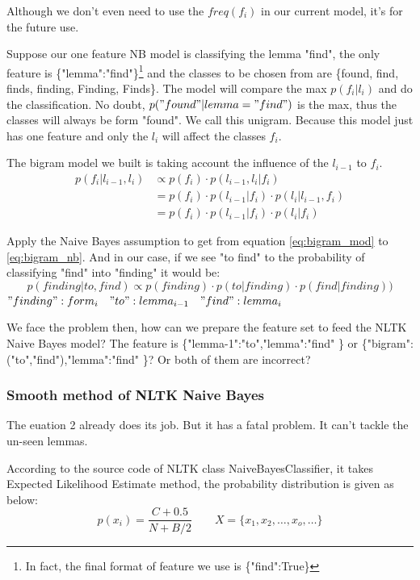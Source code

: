 \documentclass[a4paper]{article}
\begin{document}
{Although we don't even need to use the $freq(f_i)$ in our current model, it's for the future use.

Suppose our one feature NB model is classifying the lemma "find", the only feature is \{"lemma":"find"\}\footnote{In fact, the final format of feature we use is \{"find":True\}} and the classes to be chosen from are \{found, find, finds, finding, Finding, Finds\}. The model will compare the max $p(f_i|l_i)$ and do the classification. No doubt, $p("found" | lemma="find")$ is the max, thus the classes will always be form "found". We call this unigram. Because this model just has one feature and only the $l_i$ will affect the classes $f_i$. 

The bigram model we built is taking account the influence of the $l_{i-1}$ to $f_i$.
\begin{align}
p(f_i|l_{i-1},l_i) &\propto p(f_i) \cdot  p(l_{i-1},l_i|f_i)  \\
&= p(f_i) \cdot  p(l_{i-1}|f_i) \cdot p( l_i | l_{i-1},f_i) \label{eq:bigram_mod} \\
&= p(f_i) \cdot  p(l_{i-1}|f_i) \cdot p( l_i | f_i) \label{eq:bigram_nb}
\end{align}

Apply the Naive Bayes assumption to get from equation \ref{eq:bigram_mod} to \ref{eq:bigram_nb}. And in our case, if we see "to find" to the probability of classifying "find" into "finding"   it would be:
\begin{equation}
p(finding | to,find) \propto p(finding)\cdot p(to | finding) \cdot  p(find | finding))
\end{equation}
$"finding":form_i \quad "to":lemma_{i-1} \quad "find":lemma_i$


We face the problem then, how can we prepare the feature set to feed the NLTK Naive Bayes model? The feature is \{"lemma-1":"to","lemma":"find" \} or 
 \{"bigram":("to","find"),"lemma":"find" \}? Or both of them are incorrect? 
\subsubsection{Smooth method of NLTK Naive Bayes}
The euation 2 already does its job. But it has a fatal problem. It can't tackle the un-seen lemmas. 

According to the source code of NLTK class NaiveBayesClassifier, it takes Expected Likelihood Estimate method, the probability distribution is given as below:
\begin{equation}
p(x_i)=\frac{C+0.5}{N+B/2} \qquad X = \{x_1,x_2,\dots,x_o,\dots\}
\end{equation}

}
\end{document}
